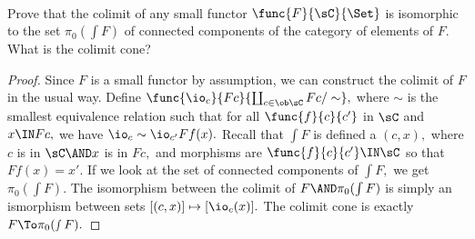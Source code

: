 \documentclass[main.tex]{subfiles}
\begin{document}
\paragraph{}
\begin{exercise}
	Prove that the colimit of any small functor $ \func{F}{\sC}{\Set} $ is
	isomorphic to the set $ \pi_0(\int F) $ of connected components of the 
	category of elements of $ F. $ What is the colimit cone?
\end{exercise}
	
\begin{proof}
Since $ F $ is a small functor by assumption, we can construct the colimit of
$ F $ in the usual way. Define $ \func{\io_c}{Fc}{\coprod_{c\in 
\ob\sC}Fc/\sim},$ where $\sim $ is the smallest equivalence relation 
such that for all $\func{f}{c}{c'} $ in $ \sC $ and $ x\IN Fc,$ we have 
$\io_c\sim\io_{c'}Ff(x).$  
Recall that $\int F$ is defined a $(c,x),$ where $c$ is in $ \sC \AND 
x$ is in $ Fc, $ and morphisms are $ \func{f}{c}{c'} \IN \sC$ so that 
$ Ff(x)=x'. $ If we look at the set of connected components of $ \int F, $
we get $ \pi_0(\int F). $
The isomorphism between the colimit of $ F\AND\pi_0(\int 
F)$ is simply an ismorphism between sets
$ [(c,x)]\mapsto [\io_c(x)]. $ The colimit cone is exactly $ 
F\To\pi_0(\smallint F).$

\end{proof}
\end{document}
